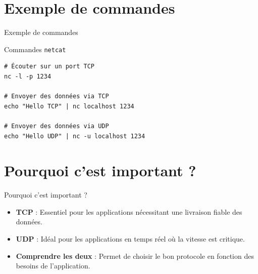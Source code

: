 \documentclass{clbeamer2024}
\begin{document}
\section{Exemple de commandes}
\begin{frame}[fragile]{Exemple de commandes}
	\begin{exampleblock}{Commandes \texttt{netcat}}
		\begin{verbatim}
# Écouter sur un port TCP
nc -l -p 1234
			
# Envoyer des données via TCP
echo "Hello TCP" | nc localhost 1234
			
# Envoyer des données via UDP
echo "Hello UDP" | nc -u localhost 1234
		\end{verbatim}
	\end{exampleblock}
\end{frame}


\section{Pourquoi c'est important ?}
\begin{frame}{Pourquoi c'est important ?}
	\begin{itemize}
		\item \textbf{TCP} : Essentiel pour les applications nécessitant une livraison fiable des données.
		\item \textbf{UDP} : Idéal pour les applications en temps réel où la vitesse est critique.
		\item \textbf{Comprendre les deux} : Permet de choisir le bon protocole en fonction des besoins de l'application.
	\end{itemize}
\end{frame}
	
\end{document}
